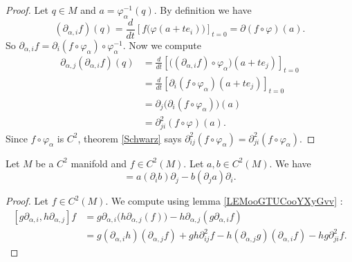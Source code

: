 \begin{proof}
	Let \( q\in M\) and \( a=\varphi_{\alpha}^{-1}(q)\). By definition we have
	\begin{equation}
		(\partial_{\alpha,i}f)(q)=\frac{d}{dt} \left[ f\big( \varphi(a+te_i) \big)  \right]_{t=0}=\partial(f\circ\varphi)(a).
	\end{equation}
	So \( \partial_{\alpha,i}f=\partial_i(f\circ\varphi_{\alpha})\circ\varphi_{\alpha}^{-1}\). Now we compute
	\begin{subequations}
		\begin{align}
			\partial_{\alpha,j}(\partial_{\alpha,i}f)(q) & =\frac{d}{dt} \left[ \big( (\partial_{\alpha,i}f)\circ \varphi_{\alpha} \big)(a+te_j)  \right]_{t=0} \\
			                                             & =\frac{d}{dt} \left[ \partial_i(f\circ\varphi_{\alpha})(a+te_j)  \right]_{t=0}                       \\
			                                             & =\partial_j\big( \partial_i(f\circ\varphi_{\alpha}) \big)(a)                                         \\
			                                             & =\partial_{ji}^2(f\circ\varphi)(a).
		\end{align}
	\end{subequations}
	Since \( f\circ\varphi_{\alpha}\) is \( C^2\), theorem \ref{Schwarz} says \( \partial^2_{ij}(f\circ\varphi_{\alpha})=\partial^2_{ji}(f\circ\varphi_{\alpha})\).
\end{proof}

\begin{lemma}       \label{LEMooQXRSooHDRequ}
	Let \( M\) be a \( C^2\) manifold and \( f\in C^2(M)\). Let \( a,b\in  C^{2}(M)\). We have
	\begin{equation}
		[a\partial_i,b\partial_j]=a(\partial_ib)\partial_j-b(\partial_ja)\partial_i.
	\end{equation}
\end{lemma}

\begin{proof}
	Let \( f\in C^2(M)\). We compute using lemma \ref{LEMooGTUCooYXyGvv} :
	\begin{subequations}
		\begin{align}
			[g\partial_{\alpha,i},h\partial_{\alpha,j}]f & =g\partial_{\alpha,i}\big( h\partial_{\alpha,j}(f) \big)-h\partial_{\alpha,j}(g\partial_{\alpha,i}f)                                \\
			                                             & =g(\partial_{\alpha,i}h)(\partial_{\alpha,j}f)+gh\partial^2_{ij}f-h(\partial_{\alpha,j}g)(\partial_{\alpha,i}f)-hg\partial^2_{ji}f.
		\end{align}
	\end{subequations}
\end{proof}

